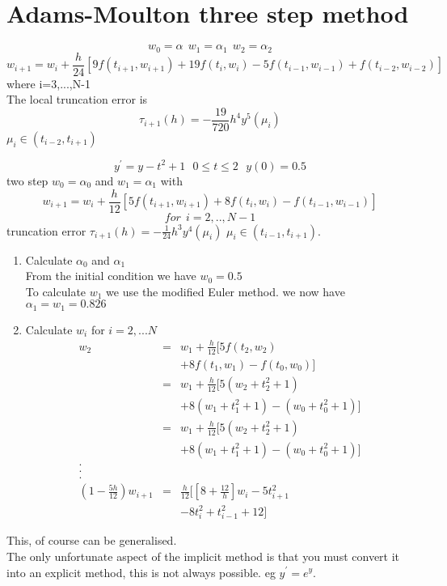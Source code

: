 \section*{Adams-Moulton three step method}
\[ w_0=\alpha \ \ w_1=\alpha_1 \ \ w_2 = \alpha_2 \]
\[w_{i+1} = w_{i}+\frac{h}{24}[9f(t_{i+1},w_{i+1}) +19 f(t_{i},w_{i})-5f(t_{i-1},w_{i-1})+f(t_{i-2},w_{i-2})  ] \]
where i=3,...,N-1\\
The local truncation error is 
\[\tau_{i+1}(h) =-\frac{19}{720}h^4 y^5(\mu_i)\]
$\mu_i \in (t_{i-2},t_{i+1})$
\begin{example}
\[ y^{'}=y-t^2+1 \ \ \ 0 \leq t \leq 2 \ \ \ y(0)=0.5 \]
 two step
$w_0=\alpha_0$ and $w_1=\alpha_1$ with
\[w_{i+1}=w_i+\frac{h}{12}[5f(t_{i+1},w_{i+1})+8f(t_{i},w_{i})-f(t_{i-1},w_{i-1})] \] 
\[  for \ \ i=2,..,N-1 \]
truncation error  $ \tau_{i+1}(h)=-\frac{1}{24}h^3 y^4(\mu_i)$ $\mu_i \in (t_{i-1},t_{i+1})$.
\begin{enumerate}
\item Calculate $\alpha_0$ and $\alpha_1$ \\
From the initial condition we have $w_0=0.5$\\
To calculate $w_1$ we use the modified Euler method.
we now have $\alpha_1=w_1=0.826$
\item Calculate $w_i$ for $i=2,...N$
\begin{eqnarray*}
w_{2}&=&w_1+\frac{h}{12}[5f(t_{2},w_{2})\\
& & +8 f(t_{1},w_{1})-f(t_{0},w_{0}) ] \\
&=&w_1+\frac{h}{12}[5(w_{2}+t_2^2+1) \\
& & +8 (w_{1}+t_1^2+1)-(w_{0}+t_0^2+1) ] \\
&=&w_1+\frac{h}{12}[5(w_{2}+t_2^2+1)\\ 
& & +8 (w_{1}+t_1^2+1)-(w_{0}+t_0^2+1) ] \\
.\\
.\\
.\\
(1-\frac{5h}{12})w_{i+1}&=&\frac{h}{12}[[8+\frac{12}{h}]w_{i}-5t_{i+1}^2\\
& & -8t_{i}^2+t_{i-1}^2+12] 
\end{eqnarray*}
\end{enumerate}
\end{example}
This, of course can be generalised.\\
The only unfortunate aspect of the implicit method is that you must convert it into an explicit method, this is not always possible. eg $y^{'}=e^y$.
